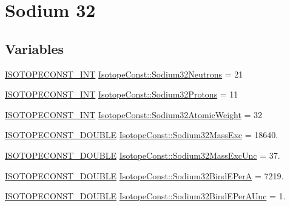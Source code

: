 \hypertarget{group___isotope_const-_sodium-_na32}{}\section{Sodium 32}
\label{group___isotope_const-_sodium-_na32}
\subsection*{Variables}
\begin{DoxyCompactItemize}
\item 
\mbox{\hyperlink{group___isotope_const-_macros_ga5f18360b3e99483a35c32d789e62621c}{I\+S\+O\+T\+O\+P\+E\+C\+O\+N\+S\+T\+\_\+\+I\+NT}} \mbox{\hyperlink{group___isotope_const-_sodium-_na32_gae7eb045e183d3c9f2039d83857efdfb4}{Isotope\+Const\+::\+Sodium32\+Neutrons}} = 21
\item 
\mbox{\hyperlink{group___isotope_const-_macros_ga5f18360b3e99483a35c32d789e62621c}{I\+S\+O\+T\+O\+P\+E\+C\+O\+N\+S\+T\+\_\+\+I\+NT}} \mbox{\hyperlink{group___isotope_const-_sodium-_na32_gae56a84145aab0f737b1445bbb1cd205d}{Isotope\+Const\+::\+Sodium32\+Protons}} = 11
\item 
\mbox{\hyperlink{group___isotope_const-_macros_ga5f18360b3e99483a35c32d789e62621c}{I\+S\+O\+T\+O\+P\+E\+C\+O\+N\+S\+T\+\_\+\+I\+NT}} \mbox{\hyperlink{group___isotope_const-_sodium-_na32_ga108e7f667d2bd22754198bd5e47ee49d}{Isotope\+Const\+::\+Sodium32\+Atomic\+Weight}} = 32
\item 
\mbox{\hyperlink{group___isotope_const-_macros_ga8f45a7272ce02c0b4c65c44636ed719a}{I\+S\+O\+T\+O\+P\+E\+C\+O\+N\+S\+T\+\_\+\+D\+O\+U\+B\+LE}} \mbox{\hyperlink{group___isotope_const-_sodium-_na32_gadf4726a6de8fd250abb20a40c302f6a8}{Isotope\+Const\+::\+Sodium32\+Mass\+Exc}} = 18640.
\item 
\mbox{\hyperlink{group___isotope_const-_macros_ga8f45a7272ce02c0b4c65c44636ed719a}{I\+S\+O\+T\+O\+P\+E\+C\+O\+N\+S\+T\+\_\+\+D\+O\+U\+B\+LE}} \mbox{\hyperlink{group___isotope_const-_sodium-_na32_ga3c076bb4c5945e5bef08e062afc75f53}{Isotope\+Const\+::\+Sodium32\+Mass\+Exc\+Unc}} = 37.
\item 
\mbox{\hyperlink{group___isotope_const-_macros_ga8f45a7272ce02c0b4c65c44636ed719a}{I\+S\+O\+T\+O\+P\+E\+C\+O\+N\+S\+T\+\_\+\+D\+O\+U\+B\+LE}} \mbox{\hyperlink{group___isotope_const-_sodium-_na32_ga1f66eeb504b61462397427cc43f01b98}{Isotope\+Const\+::\+Sodium32\+Bind\+E\+PerA}} = 7219.
\item 
\mbox{\hyperlink{group___isotope_const-_macros_ga8f45a7272ce02c0b4c65c44636ed719a}{I\+S\+O\+T\+O\+P\+E\+C\+O\+N\+S\+T\+\_\+\+D\+O\+U\+B\+LE}} \mbox{\hyperlink{group___isotope_const-_sodium-_na32_gaf6de90aaabd13daf29a502f64bef31f0}{Isotope\+Const\+::\+Sodium32\+Bind\+E\+Per\+A\+Unc}} = 1.

\end{DoxyCompactItemize}
